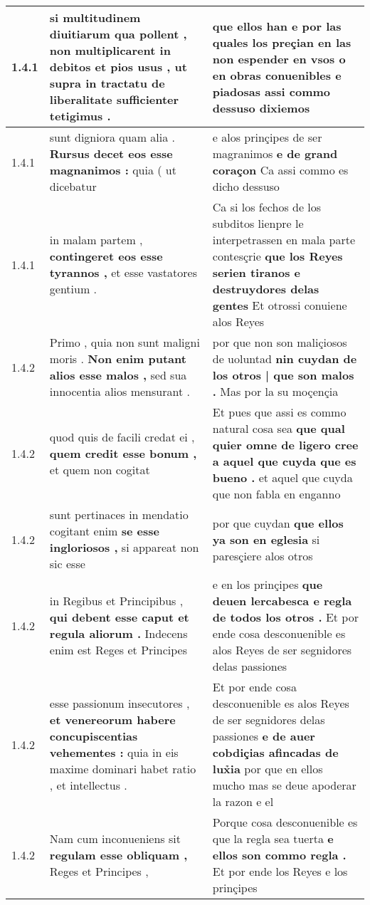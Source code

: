\begin{tabular}{|p{1cm}|p{6.5cm}|p{6.5cm}|}
1.4.1 & si multitudinem diuitiarum qua pollent , \textbf{ non multiplicarent in debitos et pios usus , } ut supra in tractatu de liberalitate sufficienter tetigimus . & que ellos han \textbf{ e por las quales los preçian en las non espender en vsos o en obras conuenibles e piadosas } assi commo dessuso dixiemos \\\hline
1.4.1 & sunt digniora quam alia . \textbf{ Rursus decet eos esse magnanimos : } quia ( ut dicebatur & e alos prinçipes de ser magranimos \textbf{ e de grand coraçon } Ca assi commo es dicho dessuso \\\hline
1.4.1 & in malam partem , \textbf{ contingeret eos esse tyrannos , } et esse vastatores gentium . & Ca si los fechos de los subditos lienpre le interpetrassen en mala parte contesçrie \textbf{ que los Reyes serien tiranos e destruydores delas gentes } Et otrossi conuiene alos Reyes \\\hline
1.4.2 & Primo , quia non sunt maligni moris . \textbf{ Non enim putant alios esse malos , } sed sua innocentia alios mensurant . & por que non son maliçiosos de uoluntad \textbf{ nin cuydan de los otros | que son malos . } Mas por la su moçençia \\\hline
1.4.2 & quod quis de facili credat ei , \textbf{ quem credit esse bonum , } et quem non cogitat & Et pues que assi es commo natural cosa sea \textbf{ que qual quier omne de ligero cree a aquel que cuyda que es bueno . } et aquel que cuyda que non fabla en enganno \\\hline
1.4.2 & sunt pertinaces in mendatio cogitant enim \textbf{ se esse ingloriosos , } si appareat non sic esse & por que cuydan \textbf{ que ellos ya son en eglesia } si paresçiere alos otros \\\hline
1.4.2 & in Regibus et Principibus , \textbf{ qui debent esse caput et regula aliorum . } Indecens enim est Reges et Principes & e en los prinçipes \textbf{ que deuen lercabesca e regla de todos los otros . } Et por ende cosa desconuenible es alos Reyes de ser segnidores delas passiones \\\hline
1.4.2 & esse passionum insecutores , \textbf{ et venereorum habere concupiscentias vehementes : } quia in eis maxime dominari habet ratio , et intellectus . & Et por ende cosa desconuenible es alos Reyes de ser segnidores delas passiones \textbf{ e de auer cobdiçias afincadas de lux̉ia } por que en ellos mucho mas se deue apoderar la razon e el \\\hline
1.4.2 & Nam cum inconueniens sit \textbf{ regulam esse obliquam , } Reges et Principes , & Porque cosa desconuenible es que la regla sea tuerta \textbf{ e ellos son commo regla . } Et por ende los Reyes e los prinçipes \\\hline

\end{tabular}
